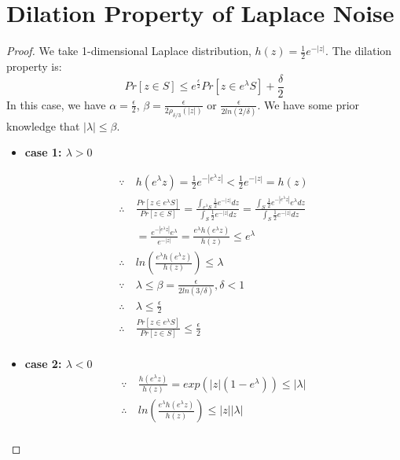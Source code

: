 \documentclass{article}
\begin{document}
\section{Dilation Property of Laplace Noise}
\label{sec_Dila}
\begin{proof}
We take 1-dimensional Laplace distribution, $h(z) = \frac{1}{2} e^{-|z|}$.
The dilation property is:
\begin{equation*}
Pr[z \in S] \leq e^{\frac{\epsilon}{2}} Pr[z \in e^{\lambda} S] + \frac{\delta}{2}
\end{equation*}
In this case, we have $\alpha = \frac{\epsilon}{2}$, $\beta = \frac{\epsilon}{2 \rho_{\delta/3}(|z|)}$ or $ \frac{\epsilon}{2 ln(2/\delta)}$. We have some prior knowledge that $|\lambda| \leq \beta$.

\begin{itemize}
	\item \textbf{case 1: $\lambda > 0$}

	\begin{equation*}
	\begin{split}
	\because\ 		& 	h(e^{\lambda} z) =  \frac{1}{2} e^{-|e^{\lambda} z|} < \frac{1}{2} e^{-|z|} = h(z)\\
	\therefore\		& 	\frac{Pr[z \in e^{\lambda} S]}{Pr[z \in S]} 
						= \frac
						{\int_{e^{\lambda} S}{} \frac{1}{2}e^{-|z|} dz}
						{\int_{S}{} \frac{1}{2}e^{-|z|} dz} 
						= \frac
						{\int_{S}{} \frac{1}{2}e^{-|e^{\lambda}z|} e^{\lambda} dz}
						{\int_{S}{} \frac{1}{2}e^{-|z|}dz} \\
					&	= \frac{e^{-|e^{\lambda}z|} e^{\lambda}}{e^{-|z|}}
						= \frac{e^{\lambda} h(e^{\lambda} z)}{h(z)}
						\leq e^{\lambda}\\
	\therefore\		&	ln(\frac{e^{\lambda} h(e^{\lambda} z)}{h(z)})
						\leq \lambda \\
	\because\		&	\lambda \leq \beta = \frac{\epsilon}{2 ln(3 / \delta)}, \delta < 1 \\
	\therefore\		&	\lambda \leq \frac{\epsilon}{2} \\
	\therefore\		&	\frac{Pr[z \in e^{\lambda} S]}{Pr[z \in S]} \leq \frac{\epsilon}{2} \\
	\end{split}
	\end{equation*}

	\item \textbf{case 2: $\lambda < 0$}
	\begin{equation*}
	\begin{split}
	\because\	& \frac{h(e^{\lambda} z)}{h(z)} = exp(|z|(1 - e^{\lambda})) \leq |\lambda|\\
	\therefore\	& ln(\frac{e^{\lambda} h(e^{\lambda} z)}{h(z)}) \leq |z||\lambda|\\
	\end{split}
	\end{equation*}


\end{itemize}
\end{proof}
\end{document}
